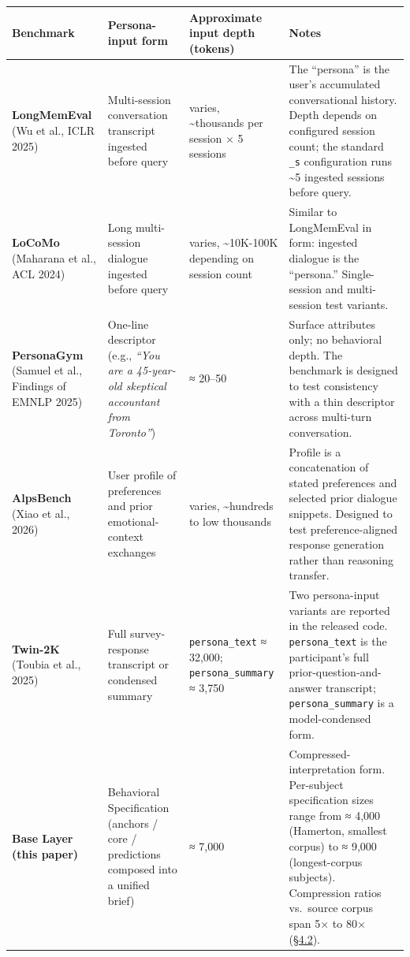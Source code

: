 \begin{longtable}[]{@{}
  >{\raggedright\arraybackslash}p{}
  >{\raggedright\arraybackslash}p{}
  >{\raggedleft\arraybackslash}p{}
  >{\raggedright\arraybackslash}p{}@{}}
\toprule
Benchmark & Persona-input form & Approximate input depth (tokens) &
Notes \\
\midrule
\endhead
\textbf{LongMemEval} (Wu et al., ICLR 2025) & Multi-session conversation
transcript ingested before query & varies, \textasciitilde thousands per
session × 5 sessions & The ``persona'' is the user's accumulated
conversational history. Depth depends on configured session count; the
standard \texttt{\_s} configuration runs \textasciitilde5 ingested
sessions before query. \\
\textbf{LoCoMo} (Maharana et al., ACL 2024) & Long multi-session
dialogue ingested before query & varies, \textasciitilde10K-100K
depending on session count & Similar to LongMemEval in form: ingested
dialogue is the ``persona.'' Single-session and multi-session test
variants. \\
\textbf{PersonaGym} (Samuel et al., Findings of EMNLP 2025) & One-line
descriptor (e.g., \emph{``You are a 45-year-old skeptical accountant
from Toronto''}) & ≈ 20--50 & Surface attributes only; no behavioral
depth. The benchmark is designed to test consistency with a thin
descriptor across multi-turn conversation. \\
\textbf{AlpsBench} (Xiao et al., 2026) & User profile of preferences and
prior emotional-context exchanges & varies, \textasciitilde hundreds to
low thousands & Profile is a concatenation of stated preferences and
selected prior dialogue snippets. Designed to test preference-aligned
response generation rather than reasoning transfer. \\
\textbf{Twin-2K} (Toubia et al., 2025) & Full survey-response transcript
or condensed summary & \texttt{persona\_text} ≈ 32,000;
\texttt{persona\_summary} ≈ 3,750 & Two persona-input variants are
reported in the released code. \texttt{persona\_text} is the
participant's full prior-question-and-answer transcript;
\texttt{persona\_summary} is a model-condensed form. \\
\textbf{Base Layer (this paper)} & Behavioral Specification (anchors /
core / predictions composed into a unified brief) & ≈ 7,000 &
Compressed-interpretation form. Per-subject specification sizes range
from ≈ 4,000 (Hamerton, smallest corpus) to ≈ 9,000 (longest-corpus
subjects). Compression ratios vs.~source corpus span 5× to 80×
(\hyperref[compression-structure-vs.-raw-text]{§4.2}). \\
\bottomrule
\end{longtable}

